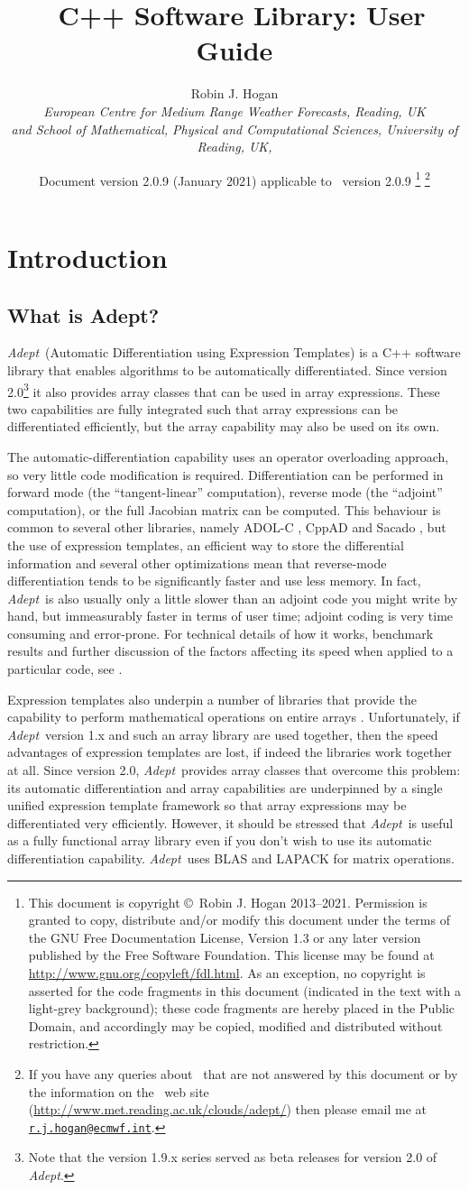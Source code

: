 \documentclass[a4,oneside]{book}
\title{\Adept\ C++ Software Library: User Guide}
\author{Robin J. Hogan\\ \emph{European Centre for Medium Range
    Weather Forecasts, Reading, UK}\\ \emph{and School of
    Mathematical, Physical and Computational Sciences, University of
    Reading, UK,}}
\date{Document version 2.0.9 (January 2021) applicable to \Adept\ version
  2.0.9 \thanks{This document is copyright \copyright\ Robin J. Hogan
    2013--2021.  Permission is granted to copy, distribute and/or
    modify this document under the terms of the GNU Free Documentation
    License, Version 1.3 or any later version published by the Free
    Software Foundation. This license may be found at
    \url{http://www.gnu.org/copyleft/fdl.html}.  As an exception, no
    copyright is asserted for the code fragments in this document
    (indicated in the text with a light-grey background); these code
    fragments are hereby placed in the Public Domain, and accordingly
    may be copied, modified and distributed without restriction.}
  \thanks{If you have any queries about \Adept\ that are not answered
    by this document or by the information on the \Adept\ web site
    (\url{http://www.met.reading.ac.uk/clouds/adept/}) then please
    email me at
    \href{mailto:r.j.hogan@ecmwf.int}{\texttt{r.j.hogan@ecmwf.int}}.}}
\def\Adept{\emph{Adept}}
\renewcommand\thefootnote{\relax}
\begin{document}
\maketitle

\tableofcontents
\def\thefootnote{\fnsymbol{footnote}}
\chapter{Introduction}
\section{What is Adept?}
\Adept\ (Automatic Differentiation using Expression Templates) is a
C++ software library that enables algorithms to be automatically
differentiated. Since version 2.0\footnote{Note that the version 1.9.x
  series served as beta releases for version 2.0 of \Adept.} it also
provides array classes that can be used in array expressions.  These
two capabilities are fully integrated such that array expressions can
be differentiated efficiently, but the array capability may also be
used on its own.

The automatic-differentiation capability uses an operator overloading
approach, so very little code modification is
required. Differentiation can be performed in forward mode (the
``tangent-linear'' computation), reverse mode (the ``adjoint''
computation), or the full Jacobian matrix can be computed. This
behaviour is common to several other libraries, namely ADOL-C
\citep{Griewank+1996}, CppAD \citep{Bell2007} and Sacado
\citep{Gay2005}, but the use of expression templates, an efficient way
to store the differential information and several other optimizations
mean that reverse-mode differentiation tends to be significantly
faster and use less memory. In fact, \Adept\ is also usually only a
little slower than an adjoint code you might write by hand, but
immeasurably faster in terms of user time; adjoint coding is very time
consuming and error-prone. For technical details of how it works,
benchmark results and further discussion of the factors affecting its
speed when applied to a particular code, see \cite{Hogan2014}.

Expression templates also underpin a number of libraries that provide
the capability to perform mathematical operations on entire arrays
\citep{Veldhuizen1995}. Unfortunately, if \Adept\ version 1.x and such
an array library are used together, then the speed advantages of
expression templates are lost, if indeed the libraries work together
at all. Since version 2.0, \Adept\ provides array classes that
overcome this problem: its automatic differentiation and array
capabilities are underpinned by a single unified expression template
framework so that array expressions may be differentiated very
efficiently.  However, it should be stressed that \Adept\ is useful as
a fully functional array library even if you don't wish to use its
automatic differentiation capability. \Adept\ uses BLAS and LAPACK for
matrix operations.
\end{document}
